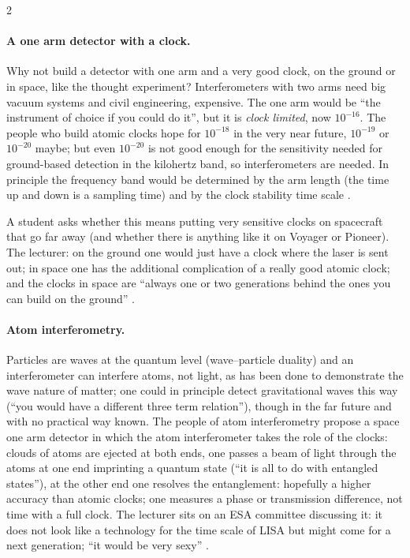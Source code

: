 \begin{paracol}{2}
\paragraph{A one arm detector with a clock.} Why not build a detector with one arm and a very good clock, on the ground or in space, like the thought experiment? Interferometers with two arms need big vacuum systems and civil engineering, expensive. The one arm would be ``the instrument of choice if you could do it'', but it is \emph{clock limited}, now $10^{-16}$. The people who build atomic clocks hope for $10^{-18}$ in the very near future, $10^{-19}$ or $10^{-20}$ maybe; but even $10^{-20}$ is not good enough for the sensitivity needed for ground-based detection in the kilohertz band, so interferometers are needed. In principle the frequency band would be determined by the arm length (the time up and down is a sampling time) and by the clock stability time scale .

\begin{coursenote}
A student asks whether this means putting very sensitive clocks on spacecraft that go far away (and whether there is anything like it on Voyager or Pioneer). The lecturer: on the ground one would just have a clock where the laser is sent out; in space one has the additional complication of a really good atomic clock; and the clocks in space are ``always one or two generations behind the ones you can build on the ground'' .
\end{coursenote}

\paragraph{Atom interferometry.} Particles are waves at the quantum level (wave--particle duality) and an interferometer can interfere atoms, not light, as has been done to demonstrate the wave nature of matter; one could in principle detect gravitational waves this way (``you would have a different three term relation''), though in the far future and with no practical way known. The people of atom interferometry propose a space one arm detector in which the atom interferometer takes the role of the clocks: clouds of atoms are ejected at both ends, one passes a beam of light through the atoms at one end imprinting a quantum state (``it is all to do with entangled states''), at the other end one resolves the entanglement: hopefully a higher accuracy than atomic clocks; one measures a phase or transmission difference, not time with a full clock. The lecturer sits on an ESA committee discussing it: it does not look like a technology for the time scale of LISA but might come for a next generation; ``it would be very sexy'' .


\end{paracol}
